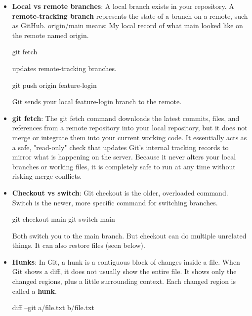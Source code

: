 \documentclass{report}
\begin{document}
\begin{itemize}
        \item \textbf{Local vs remote branches}: A local branch exists in your repository. A \textbf{remote-tracking branch} represents the state of a branch on a remote, such as GitHub.
            \bigbreak \noindent 
            origin/main means: My local record of what main looked like on the remote named origin.
            \bigbreak \noindent 
            \begin{bashcode}
                git fetch
            \end{bashcode}
            \bigbreak \noindent 
            updates remote-tracking branches.
            \bigbreak \noindent 
            \begin{bashcode}
                git push origin feature-login
            \end{bashcode}
            \bigbreak \noindent 
            Git sends your local feature-login branch to the remote.
        \item \textbf{git fetch}: The git fetch command downloads the latest commits, files, and references from a remote repository into your local repository, but it does not merge or integrate them into your current working code.
            \bigbreak \noindent 
            It essentially acts as a safe, "read-only" check that updates Git's internal tracking records to mirror what is happening on the server. Because it never alters your local branches or working files, it is completely safe to run at any time without risking merge conflicts.
        \item \textbf{Checkout vs switch}: Git checkout is the older, overloaded command. Switch is the newer, more specific command for switching branches.
            \bigbreak \noindent 
            \begin{bashcode}
                git checkout main
                git switch main
            \end{bashcode}
            \bigbreak \noindent 
            Both switch you to the main branch. But checkout can do multiple unrelated things. It can also restore files (seen below).
        \item \textbf{Hunks}: In Git, a hunk is a contiguous block of changes inside a file. When Git shows a diff, it does not usually show the entire file. It shows only the changed regions, plus a little surrounding context. Each changed region is called a \textbf{hunk}.
            \bigbreak \noindent 
            \begin{bashcode}
                diff --git a/file.txt b/file.txt

\end{bashcode}
\end{itemize}
\end{document}
